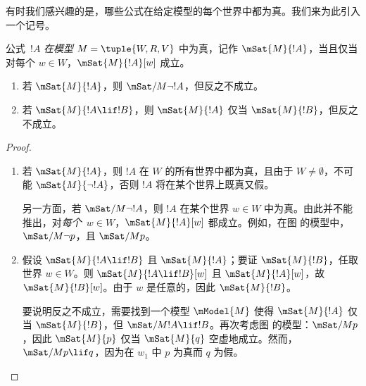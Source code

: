 \documentclass[../../../include/open-logic-section]{subfiles}
\begin{document}


有时我们感兴趣的是，哪些公式在给定模型的每个世界中都为真。我们来为此引入一个记号。

\begin{defn}
  公式~$!A$ \emph{在模型} $M = \tuple{W, R,
    V}$ 中为真，记作 $\mSat{M}{!A}$，当且仅当对每个 $w \in W$，$\mSat{M}{!A}[w]$
  成立。
\end{defn}

\begin{prop}
  \begin{enumerate}
  \item 若 $\mSat{M}{!A}$，则 $\mSat/{M}{\lnot !A}$，但反之不成立。
  \item 若 $\mSat{M}{!A \lif !B}$，则 $\mSat{M}{!A}$ 仅当
    $\mSat{M}{!B}$，但反之不成立。
  \end{enumerate}
\end{prop}

\begin{proof}
  \begin{enumerate}
  \item 若 $\mSat{M}{!A}$，则 $!A$ 在 $W$ 的所有世界中都为真，且由于 $W \neq \emptyset$，不可能 $\mSat{M}{\lnot!A}$，否则 $!A$ 将在某个世界上既真又假。

    另一方面，若 $\mSat/{M}{\lnot !A}$，则 $!A$ 在某个世界 $w \in W$ 中为真。由此并不能推出，对\emph{每个}~$w \in W$，$\mSat{M}{!A}[w]$
    都成立。例如，在图  的模型中，$\mSat/{M}{\lnot p}$，且 $\mSat/{M}{p}$。
  \item 假设 $\mSat{M}{!A \lif !B}$ 且 $\mSat{M}{!A}$；要证
    $\mSat{M}{!B}$，任取世界 $w \in W$。则
    $\mSat{M}{!A \lif !B}[w]$ 且 $\mSat{M}{!A}[w]$，故
    $\mSat{M}{!B}[w]$。由于 $w$ 是任意的，因此 $\mSat{M}{!B}$。

    要说明反之不成立，需要找到一个模型
    $\mModel{M}$ 使得 $\mSat{M}{!A}$ 仅当 $\mSat{M}{!B}$，但
    $\mSat/{M}{!A \lif !B}$。再次考虑图  的模型：$\mSat/{M}{p}$，因此 $\mSat{M}{p}$ 仅当 $\mSat{M}{q}$ 空虚地成立。然而，$\mSat/{M}{p \lif
      q}$，因为在 $w_1$ 中 $p$ 为真而 $q$ 为假。
  \end{enumerate}
\end{proof}
\end{document}
